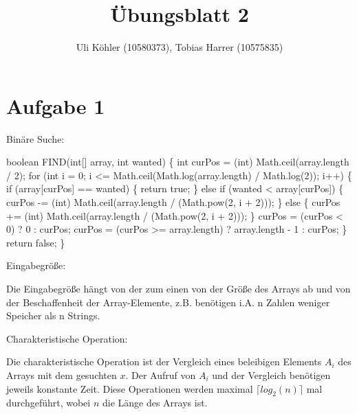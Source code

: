 \documentclass[a4paper,10pt,freqn]{article}
\title{Übungsblatt 2}
\author{Uli Köhler (10580373), Tobias Harrer (10575835)}
\begin{document}
\maketitle

\section*{Aufgabe 1}
Binäre Suche:\newline

boolean FIND(int[] array, int wanted) \{\newline
        int curPos = (int) Math.ceil(array.length / 2);\newline
        for (int i = 0; i <= Math.ceil(Math.log(array.length) / Math.log(2)); i++) \{\newline
            if (array[curPos] == wanted) \{\newline
                return true;\newline
            \} else if (wanted < array[curPos]) \{\newline
                curPos -= (int) Math.ceil(array.length / (Math.pow(2, i + 2)));\newline
            \} else \{\newline
                curPos += (int) Math.ceil(array.length / (Math.pow(2, i + 2)));\newline
            \}\newline
            curPos = (curPos < 0) ? 0 : curPos;\newline
            curPos = (curPos >= array.length) ? array.length - 1 : curPos;\newline
        \}\newline
        return false;\newline
    	\}\newline
    	
\begin{bfseries}Eingabegröße:\end{bfseries}\newline
Die Eingabegröße hängt von  der zum einen von der Größe des Arrays ab und von der
Beschaffenheit der Array-Elemente, z.B. benötigen i.A. n Zahlen weniger Speicher
als n Strings.

\begin{bfseries}Charakteristische Operation:\end{bfseries}\newline
Die charakteristische Operation ist der Vergleich eines beleibigen Elements $A_i$ des Arrays mit dem gesuchten $x$.
Der Aufruf von $A_i$ und der Vergleich benötigen jeweils konstante Zeit. Diese Operationen werden maximal
$\lceil log_{2}(n)\rceil$ mal durchgeführt, wobei $n$ die Länge des Arrays ist.
\end{document}
